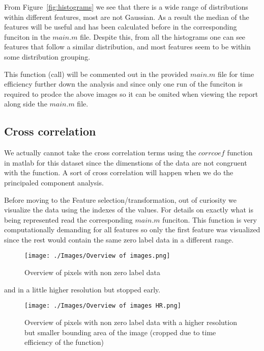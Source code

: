 \documentclass[12pt, a4paper]{article}
\begin{document}
From Figure~\ref{fig:histograms} we see that there is a wide range of distributions within different features, most are not Gaussian. As a result the median of the features will be useful and has been calculated before in the corresponding funciton in the $main.m$ file. Despite this, from all the histograms one can see features that follow a similar distribution, and most features seem to be within some distribution grouping.
\newline

This function (call) will be commented out in the provided $main.m$ file for time efficiency further down the analysis and since only one run of the funciton is required to prodce the above images so it can be omited when viewing the report along side the $main.m$ file.
\newline

\subsection{Cross correlation} \label{cross}

We actually cannot take the cross correlation terms using the $corrcoef$ function in matlab for this dataset since the dimenstions of the data are not congruent with the function. A sort of cross correlation will happen when we do the principaled component analysis.
\newline

Before moving to the Feature selection/transformation, out of curiosity we visualize the data using the indexes of the values. For details on exactly what is being represented read the corresponding $main.m$ funciton. This function is very computationally demanding for all features so only the first feature was visualized since the rest would contain the same zero label data in a different range.

\begin{figure}
    \begin{center}
        \texttt{[image: ./Images/Overview of images.png]}
    \end{center}
    \caption{Overview of pixels with non zero label data}\label{fig:overview}
\end{figure}

and in a little higher resolution but stopped early.

\begin{figure}
    \begin{center}
        \texttt{[image: ./Images/Overview of images HR.png]}
    \end{center}
    \caption{Overview of pixels with non zero label data with a higher resolution but smaller bounding area of the image (cropped due to time efficiency of the function)}\label{fig:overview hd}
\end{figure}
\end{document}
